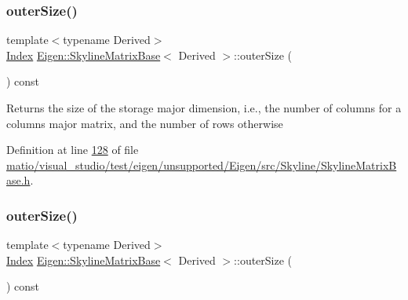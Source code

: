 \subsubsection{\texorpdfstring{outer\+Size()}{outerSize()}\hspace{0.1cm}{\footnotesize\ttfamily [1/2]}}
{\footnotesize\ttfamily template$<$typename Derived$>$ \\
\hyperlink{group___core___module_a554f30542cc2316add4b1ea0a492ff02}{Index} \hyperlink{class_eigen_1_1_skyline_matrix_base}{Eigen\+::\+Skyline\+Matrix\+Base}$<$ Derived $>$\+::outer\+Size (\begin{DoxyParamCaption}{ }\end{DoxyParamCaption}) const\hspace{0.3cm}{\ttfamily [inline]}}

\begin{DoxyReturn}{Returns}
the size of the storage major dimension, i.\+e., the number of columns for a columns major matrix, and the number of rows otherwise 
\end{DoxyReturn}


Definition at line \hyperlink{matio_2visual__studio_2test_2eigen_2unsupported_2_eigen_2src_2_skyline_2_skyline_matrix_base_8h_source_l00128}{128} of file \hyperlink{matio_2visual__studio_2test_2eigen_2unsupported_2_eigen_2src_2_skyline_2_skyline_matrix_base_8h_source}{matio/visual\+\_\+studio/test/eigen/unsupported/\+Eigen/src/\+Skyline/\+Skyline\+Matrix\+Base.\+h}.

\mbox{\label{class_eigen_1_1_skyline_matrix_base_a63cc4a263d32a8a225e4a42e891b8ac0}} 
\subsubsection{\texorpdfstring{outer\+Size()}{outerSize()}\hspace{0.1cm}{\footnotesize\ttfamily [2/2]}}
{\footnotesize\ttfamily template$<$typename Derived$>$ \\
\hyperlink{group___core___module_a554f30542cc2316add4b1ea0a492ff02}{Index} \hyperlink{class_eigen_1_1_skyline_matrix_base}{Eigen\+::\+Skyline\+Matrix\+Base}$<$ Derived $>$\+::outer\+Size (\begin{DoxyParamCaption}{ }\end{DoxyParamCaption}) const\hspace{0.3cm}{\ttfamily [inline]}}

